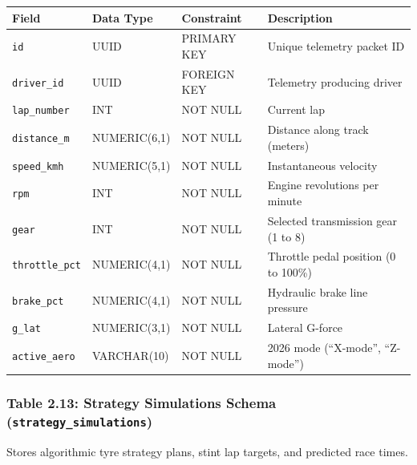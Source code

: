 \documentclass[12pt,a4paper]{report}
\begin{document}
\begin{table}[H]
\centering
\small
\begin{tabularx}{\textwidth}{l p{2.6cm} p{2.6cm} X}
\toprule
\rowcolor{gray!15}
\textbf{Field} & \textbf{Data Type} & \textbf{Constraint} & \textbf{Description} \\
\midrule
\texttt{id} & UUID & PRIMARY KEY & Unique telemetry packet ID \\
\texttt{driver\_id} & UUID & FOREIGN KEY & Telemetry producing driver \\
\texttt{lap\_number} & INT & NOT NULL & Current lap \\
\texttt{distance\_m} & NUMERIC(6,1) & NOT NULL & Distance along track (meters) \\
\texttt{speed\_kmh} & NUMERIC(5,1) & NOT NULL & Instantaneous velocity \\
\texttt{rpm} & INT & NOT NULL & Engine revolutions per minute \\
\texttt{gear} & INT & NOT NULL & Selected transmission gear (1 to 8) \\
\texttt{throttle\_pct} & NUMERIC(4,1) & NOT NULL & Throttle pedal position (0 to 100\%) \\
\texttt{brake\_pct} & NUMERIC(4,1) & NOT NULL & Hydraulic brake line pressure \\
\texttt{g\_lat} & NUMERIC(3,1) & NOT NULL & Lateral G-force \\
\texttt{active\_aero} & VARCHAR(10) & NOT NULL & 2026 mode (``X-mode'', ``Z-mode'') \\
\bottomrule
\end{tabularx}
\end{table}

\newpage
\subsubsection*{Table 2.13: Strategy Simulations Schema (\textnormal{\texttt{strategy\_simulations}})}
Stores algorithmic tyre strategy plans, stint lap targets, and predicted race times.
\end{document}
